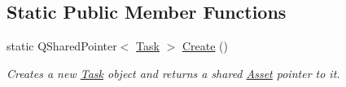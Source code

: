 \subsection*{Static Public Member Functions}
\begin{DoxyCompactItemize}
\item 
\hypertarget{class_picto_1_1_task_aa874b1d183ce0e21a815710a38af09a5}{static Q\-Shared\-Pointer$<$ \hyperlink{class_picto_1_1_task}{Task} $>$ \hyperlink{class_picto_1_1_task_aa874b1d183ce0e21a815710a38af09a5}{Create} ()}\label{class_picto_1_1_task_aa874b1d183ce0e21a815710a38af09a5}

\begin{DoxyCompactList}\small\item\em Creates a new \hyperlink{class_picto_1_1_task}{Task} object and returns a shared \hyperlink{class_picto_1_1_asset}{Asset} pointer to it. \end{DoxyCompactList}\end{DoxyCompactItemize}
